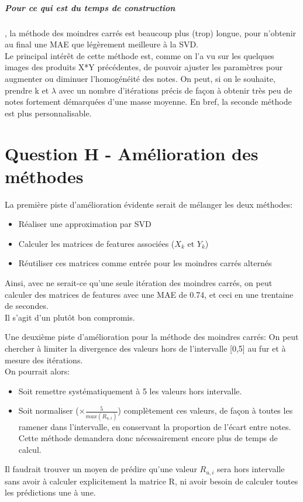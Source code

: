 \documentclass[12pt,a4paper]{article}
\begin{document}
\subparagraph{Pour ce qui est du temps de construction}, la méthode des moindres carrés est beaucoup plus (trop) longue, pour n'obtenir au final une MAE que légèrement meilleure à la SVD.\\

Le principal intérêt de cette méthode est, comme on l'a vu sur les quelques images des produits X*Y précédentes, de pouvoir ajuster les paramètres pour augmenter ou diminuer l'homogénéité des notes. On peut, si on le souhaite, prendre k et $\lambda$ avec un nombre d'itérations précis de façon à obtenir très peu de notes fortement démarquées d'une masse moyenne. En bref, la seconde méthode est plus personnalisable.

\section{Question H - Amélioration des méthodes}
La première piste d'amélioration évidente serait de mélanger les deux méthodes: 
\begin{itemize}
\item Réaliser une approximation par SVD
\item Calculer les matrices de features associées ($X_k$ et $Y_k$)
\item Réutiliser ces matrices comme entrée pour les moindres carrés alternés
\end{itemize}
Ainsi, avec ne serait-ce qu'une seule itération des moindres carrés, on peut calculer des matrices de features avec une MAE de 0.74, et ceci en une trentaine de secondes.\\
Il s'agit d'un plutôt bon compromis.\\

\vspace{1cm}

Une deuxième piste d'amélioration pour la méthode des moindres carrés: On peut chercher à limiter la divergence des valeurs hors de l'intervalle [0,5] au fur et à mesure des itérations.\\
On pourrait alors:
\begin{itemize}
\item Soit remettre systématiquement à 5 les valeurs hors intervalle.
\item Soit normaliser ($ \times \frac{5}{max(R_{u,i})}$) complètement ces valeurs, de façon à toutes les ramener dans l'intervalle, en conservant la proportion de l'écart entre notes. Cette méthode demandera donc nécessairement encore plus de temps de calcul.
\end{itemize}
Il faudrait trouver un moyen de prédire qu'une valeur $R_{u,i}$ sera hors intervalle sans avoir à calculer explicitement la matrice R, ni avoir besoin de calculer toutes les prédictions une à une.\\
 
\end{document}

